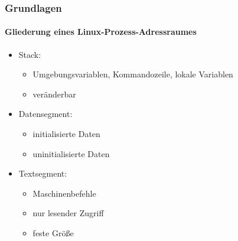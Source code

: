 \documentclass[ddcfooter,nosectionnum]{tudbeamer}
\begin{document}
\begin{frame}
	\frametitle{Grundlagen}
    \framesubtitle {Gliederung eines Linux-Prozess-Adressraumes }
	
\begin{minipage}[b]{0.7\textwidth}
			\begin{itemize}
		 		\item Stack:  
				\begin{itemize}
					\item Umgebungsvariablen, Kommandozeile, lokale Variablen
					\item veränderbar
				\end{itemize}  	
				\item Datensegment:  
				\begin{itemize}
					\item initialisierte Daten    
					\item uninitialisierte Daten
				\end{itemize}
				\item Textsegment: 
				\begin{itemize}
					\item Maschinenbefehle
					\item nur lesender Zugriff
					\item feste Größe 
				\end{itemize}
    		\end{itemize}
\end{minipage}
%
\begin{minipage}[b] {0.29\textwidth}

\end{minipage}
\end{frame}
\end{document}
